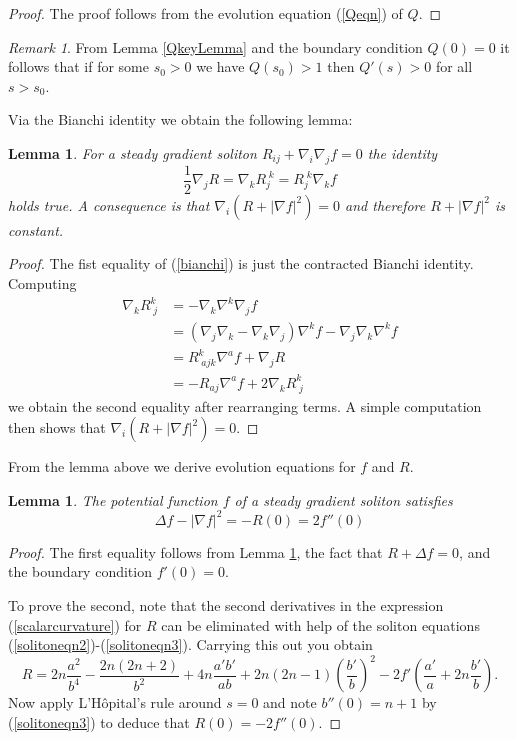 \documentclass{amsart}
\newtheorem{lem}[thm]{Lemma}
\theoremstyle{definition}
\theoremstyle{remark}
\newtheorem{remark}[thm]{Remark}
\numberwithin{equation}{section}
\begin{document}
\begin{proof}
The proof follows from the evolution equation (\ref{Qeqn}) of $Q$.
\end{proof}
\begin{remark}
From Lemma \ref{QkeyLemma} and the boundary condition $Q(0) = 0$ it follows that if for some $s_0 > 0$ we have $Q(s_0)>1$ then $Q'(s)>0$ for all $s>s_0$.
\end{remark}
Via the Bianchi identity we obtain the following lemma:
\begin{lem}
\label{bianchi-Lemma}
For a steady gradient soliton $R_{ij} + \nabla_i \nabla_j f = 0$ the identity
\begin{equation}
\label{bianchi}
\frac{1}{2} \nabla_j R = \nabla_k R^{\;k}_j = R_j^{\;k}\nabla_k f 
\end{equation}
holds true. A consequence is that $\nabla_i \left(R + |\nabla f|^2\right) = 0$ and therefore $R + |\nabla f|^2$ is constant.
\end{lem}
\begin{proof}
The fist equality of (\ref{bianchi}) is just the contracted Bianchi identity. Computing
\begin{align*}
\nabla_k R^k_{\;j} &= - \nabla_k \nabla^k\nabla_j f \\
&=(\nabla_j \nabla_k -\nabla_k \nabla_j) \nabla^k f - \nabla_j \nabla_k \nabla^k f \\
&=R^k_{\; ajk} \nabla^a f + \nabla_j R \\
&=- R_{aj} \nabla^a f + 2\nabla_k R^k_{\;j}
\end{align*}
we obtain the second equality after rearranging terms. A simple computation then shows that $\nabla_i \left(R + |\nabla f|^2\right) = 0$.
 \end{proof}
From the lemma above we derive evolution equations for $f$ and $R$.

\begin{lem}
\label{lem:feqn-integrated}
The potential function $f$ of a steady gradient soliton satisfies
\begin{equation}
\label{feqn}
\Delta f -|\nabla f|^2  = - R(0) = 2f''(0)
\end{equation}
\end{lem}
\begin{proof}
The first equality follows from Lemma \ref{bianchi-Lemma}, the fact that $R + \Delta f = 0$, and the boundary condition $f'(0) = 0$.

To prove the second, note that the second derivatives in the expression (\ref{scalarcurvature}) for $R$ can be eliminated with help of the soliton equations (\ref{solitoneqn2})-(\ref{solitoneqn3}). Carrying this out you obtain 
\begin{equation}
\label{Rfirstorder}
R = 2n \frac{a^2}{b^4} - \frac{2n(2n+2)}{b^2} + 4n \frac{a'b'}{ab}+ 2n(2n-1)\left(\frac{b'}{b}\right)^2 -2f'\left(\frac{a'}{a} + 2n \frac{b'}{b}\right).
\end{equation} 
Now apply L'H\^opital's rule around $s=0$ and note $b''(0) = n+1$ by (\ref{solitoneqn3}) to deduce that $R(0) = -2f''(0)$.
\end{proof}
\end{document}
